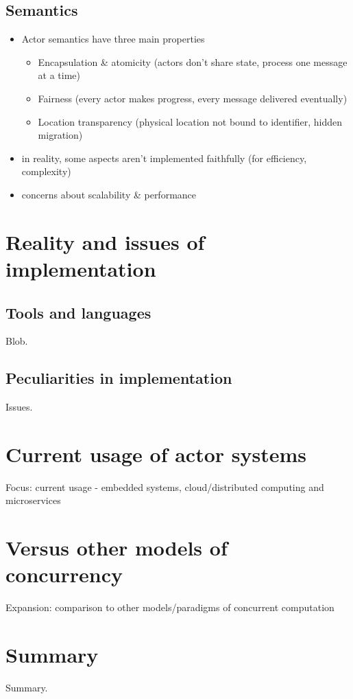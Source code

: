 \documentclass[A4]{article}
\begin{document}
\subsection{Semantics}
\begin{itemize}
\item Actor semantics have three main properties
	\begin{itemize}
	\item Encapsulation \& atomicity
	(actors don't share state, process one message at a time)
	\item Fairness
	(every actor makes progress, every message delivered eventually)
	\item Location transparency
	(physical location not bound to identifier, hidden migration)
	\end{itemize}
\item in reality, some aspects aren't implemented faithfully (for efficiency, complexity)
\item concerns about scalability \& performance
\end{itemize}

\section{Reality and issues of implementation}
\subsection{Tools and languages}
Blob.

\subsection{Peculiarities in implementation}
Issues.

\section{Current usage of actor systems}
Focus: current usage - embedded systems, cloud/distributed computing and microservices

\section{Versus other models of concurrency}
Expansion: comparison to other models/paradigms of concurrent computation

\section{Summary}
\label{summary}
Summary.

\nocite{robotron,
stonx,vice,650sim,herculessim,zib,4004,thermal1,thermal2,rojas}




\end{document}
